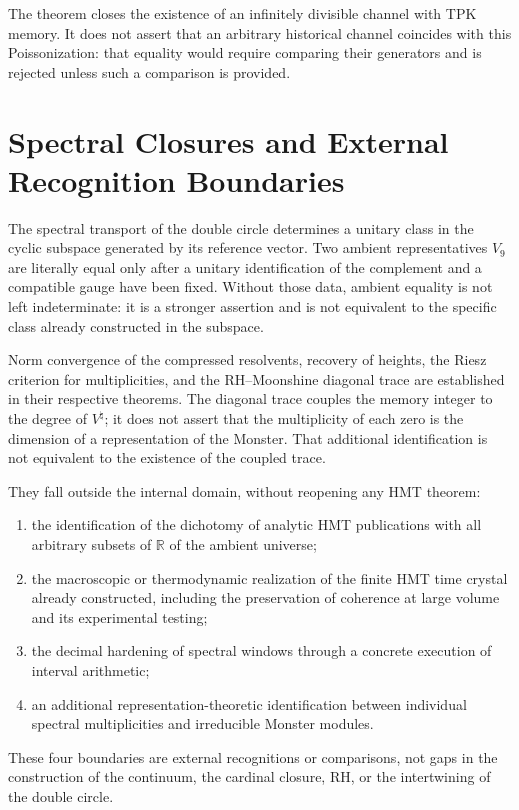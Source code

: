 The theorem closes the existence of an infinitely divisible channel with
TPK memory\@. It does not assert that an arbitrary historical channel coincides with this
Poissonization: that equality would require comparing their generators and is
rejected unless such a comparison is provided.

\section{Spectral Closures and External Recognition Boundaries}
\label{sec:hmt-final-clausuras-espectrales-externas}

\begin{proposition}
\label{prop:hmt-final-equivalencia-calibrada-vnueve}
The spectral transport of the double circle determines a unitary class in the cyclic subspace generated by its reference vector. Two ambient representatives \(V_9\) are literally equal only after a unitary identification of the complement and a compatible gauge have been fixed. Without those data, ambient equality is not left indeterminate: it is a stronger assertion and is not equivalent to the specific class already constructed in the subspace.
\end{proposition}

Norm convergence of the compressed resolvents, recovery of heights, the Riesz criterion for multiplicities, and the RH--Moonshine diagonal trace are established in their respective theorems. The diagonal trace couples the memory integer to the degree of \(V^{\natural}\); it does not assert that the multiplicity of each zero is the dimension of a representation of the Monster. That additional identification is not equivalent to the existence of the coupled trace.

They fall outside the internal domain, without reopening any HMT theorem:
\begin{enumerate}
 \item the identification of the dichotomy of analytic HMT publications with
 all arbitrary subsets of \(\mathbb R\) of the ambient universe;
 \item the macroscopic or thermodynamic realization of the finite HMT time
 crystal already constructed, including the preservation of coherence at large
 volume and its experimental testing;
 \item the decimal hardening of spectral windows through a
 concrete execution of interval arithmetic;
 \item an additional representation-theoretic identification between individual spectral
 multiplicities and irreducible Monster modules.
\end{enumerate}
These four boundaries are external recognitions or comparisons, not
gaps in the construction of the continuum, the cardinal closure, RH, or the
intertwining of the double circle.

